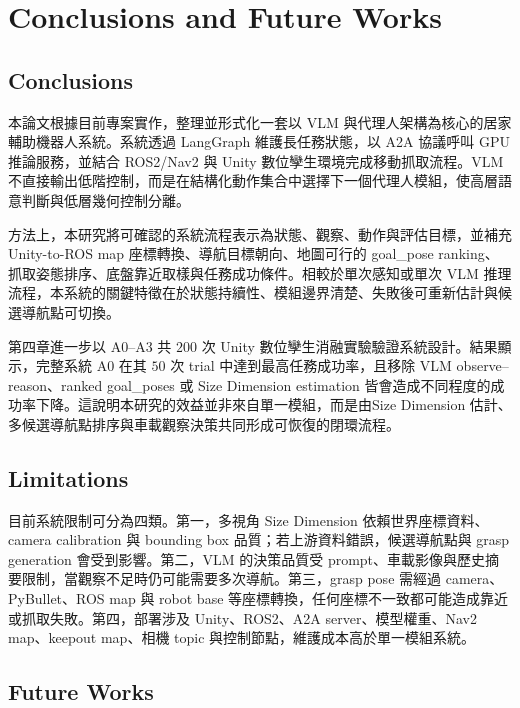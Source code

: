 \documentclass[12pt,a4paper]{article}
\begin{document}
\section{Conclusions and Future Works}

\subsection{Conclusions}

本論文根據目前專案實作，整理並形式化一套以 VLM 與代理人架構為核心的居家輔助機器人系統。系統透過 LangGraph 維護長任務狀態，以 A2A 協議呼叫 GPU 推論服務，並結合 ROS2/Nav2 與 Unity 數位孿生環境完成移動抓取流程。VLM 不直接輸出低階控制，而是在結構化動作集合中選擇下一個代理人模組，使高層語意判斷與低層幾何控制分離。

方法上，本研究將可確認的系統流程表示為狀態、觀察、動作與評估目標，並補充 Unity-to-ROS map 座標轉換、導航目標朝向、地圖可行的 goal\_pose ranking、抓取姿態排序、底盤靠近取樣與任務成功條件。相較於單次感知或單次 VLM 推理流程，本系統的關鍵特徵在於狀態持續性、模組邊界清楚、失敗後可重新估計與候選導航點可切換。

第四章進一步以 A0--A3 共 $200$ 次 Unity 數位孿生消融實驗驗證系統設計。結果顯示，完整系統 A0 在其 $50$ 次 trial 中達到最高任務成功率，且移除 VLM observe--reason、ranked goal\_poses 或 Size Dimension estimation 皆會造成不同程度的成功率下降。這說明本研究的效益並非來自單一模組，而是由Size Dimension 估計、多候選導航點排序與車載觀察決策共同形成可恢復的閉環流程。

\subsection{Limitations}

目前系統限制可分為四類。第一，多視角 Size Dimension 依賴世界座標資料、camera calibration 與 bounding box 品質；若上游資料錯誤，候選導航點與 grasp generation 會受到影響。第二，VLM 的決策品質受 prompt、車載影像與歷史摘要限制，當觀察不足時仍可能需要多次導航。第三，grasp pose 需經過 camera、PyBullet、ROS map 與 robot base 等座標轉換，任何座標不一致都可能造成靠近或抓取失敗。第四，部署涉及 Unity、ROS2、A2A server、模型權重、Nav2 map、keepout map、相機 topic 與控制節點，維護成本高於單一模組系統。

\subsection{Future Works}
\end{document}
